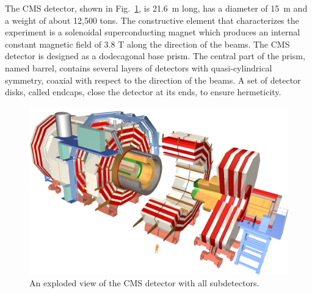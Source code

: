 The CMS detector, shown in Fig.~\ref{cms}, is 21.6~m long, has a diameter of 15~m and a
weight of about 12,500 tons. The constructive element that characterizes the experiment
is a solenoidal superconducting magnet which produces an internal constant magnetic
field of 3.8 T along the direction of the beams. The CMS detector is designed as a
dodecagonal base prism. The central part of the prism, named barrel, contains several
layers of detectors with quasi-cylindrical symmetry, coaxial with respect to the direction of the
beams. A set of detector disks, called endcaps, close the detector at its ends, to ensure hermeticity. 
\begin{figure}
\centering
\includegraphics[scale= 0.21]{../Cap2/cms} %
\caption{An exploded view of the CMS detector with all subdetectors.}
\label{cms}
\end{figure}

